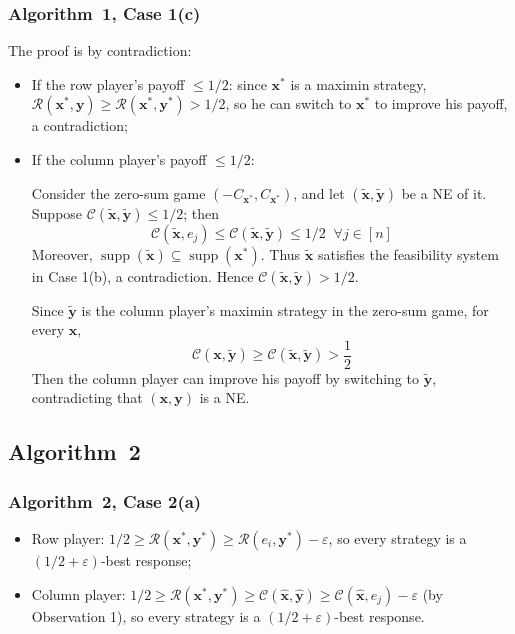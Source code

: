 \subsubsection{Algorithm~1, Case 1(c)}
\label{app:case-one-both-high}

The proof is by contradiction:

\begin{itemize}
  \item If the row player's payoff $\le 1/2$: since $\mathbf{x}^*$ is a maximin strategy, $\mathcal{R}(\mathbf{x}^*, \mathbf{y}) \ge \mathcal{R}(\mathbf{x}^*, \mathbf{y}^*) > 1/2$, so he can switch to $\mathbf{x}^*$ to improve his payoff, a contradiction;

  \item If the column player's payoff $\le 1/2$:

        Consider the zero-sum game $(-C_{\mathbf{x}^*}, C_{\mathbf{x}^*})$, and let $(\tilde{\mathbf{x}}, \tilde{\mathbf{y}})$ be a NE of it. Suppose $\mathcal{C}(\tilde{\mathbf{x}}, \tilde{\mathbf{y}}) \le 1/2$; then
        \[
          \mathcal{C}(\tilde{\mathbf{x}}, e_j) \le \mathcal{C}(\tilde{\mathbf{x}}, \tilde{\mathbf{y}}) \le 1/2 \;\; \forall j \in [n]
        \]
        Moreover, $\operatorname{supp}(\tilde{\mathbf{x}}) \subseteq \operatorname{supp}(\mathbf{x}^*)$. Thus $\tilde{\mathbf{x}}$ satisfies the feasibility system in Case 1(b), a contradiction. Hence $\mathcal{C}(\tilde{\mathbf{x}}, \tilde{\mathbf{y}}) > 1/2$.

        Since $\tilde{\mathbf{y}}$ is the column player's maximin strategy in the zero-sum game, for every $\mathbf{x}$,
        \[
          \mathcal{C}(\mathbf{x}, \tilde{\mathbf{y}}) \ge \mathcal{C}(\tilde{\mathbf{x}}, \tilde{\mathbf{y}}) > \frac{1}{2}
        \]
        Then the column player can improve his payoff by switching to $\tilde{\mathbf{y}}$, contradicting that $(\mathbf{x}, \mathbf{y})$ is a NE.
\end{itemize}

\subsection{Algorithm~2}
\label{app:case-analysis-details-algo-2}

\subsubsection{Algorithm~2, Case 2(a)}
\label{app:case-two-low}

\begin{itemize}
  \item Row player: $1/2 \ge \mathcal{R}(\mathbf{x}^*, \mathbf{y}^*) \ge \mathcal{R}(e_i, \mathbf{y}^*) - \varepsilon$, so every strategy is a $(1/2 + \varepsilon)$-best response;
  \item Column player: $1/2 \ge \mathcal{R}(\mathbf{x}^*, \mathbf{y}^*) \ge \mathcal{C}(\hat{\mathbf{x}}, \hat{\mathbf{y}}) \ge \mathcal{C}(\hat{\mathbf{x}}, e_j) - \varepsilon$ (by Observation 1), so every strategy is a $(1/2 + \varepsilon)$-best response.
\end{itemize}

